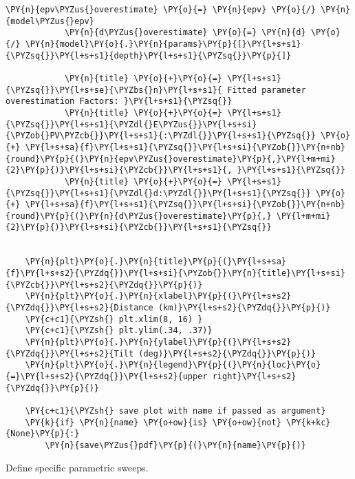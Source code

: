 \begin{tcolorbox}[breakable, size=fbox, boxrule=1pt, pad at break*=1mm,colback=cellbackground, colframe=cellborder]
\begin{Verbatim}[commandchars=\\\{\}]
            \PY{n}{epv\PYZus{}overestimate} \PY{o}{=} \PY{n}{epv} \PY{o}{/} \PY{n}{model\PYZus{}epv}
            \PY{n}{d\PYZus{}overestimate} \PY{o}{=} \PY{n}{d} \PY{o}{/} \PY{n}{model}\PY{o}{.}\PY{n}{params}\PY{p}{[}\PY{l+s+s1}{\PYZsq{}}\PY{l+s+s1}{depth}\PY{l+s+s1}{\PYZsq{}}\PY{p}{]}

            \PY{n}{title} \PY{o}{+}\PY{o}{=} \PY{l+s+s1}{\PYZsq{}}\PY{l+s+se}{\PYZbs{}n}\PY{l+s+s1}{ Fitted parameter overestimation Factors: }\PY{l+s+s1}{\PYZsq{}}
            \PY{n}{title} \PY{o}{+}\PY{o}{=} \PY{l+s+s1}{\PYZsq{}}\PY{l+s+s1}{\PYZdl{}E\PYZus{}}\PY{l+s+si}{\PYZob{}PV\PYZcb{}}\PY{l+s+s1}{:\PYZdl{}}\PY{l+s+s1}{\PYZsq{}} \PY{o}{+} \PY{l+s+sa}{f}\PY{l+s+s1}{\PYZsq{}}\PY{l+s+si}{\PYZob{}}\PY{n+nb}{round}\PY{p}{(}\PY{n}{epv\PYZus{}overestimate}\PY{p}{,}\PY{l+m+mi}{2}\PY{p}{)}\PY{l+s+si}{\PYZcb{}}\PY{l+s+s1}{, }\PY{l+s+s1}{\PYZsq{}}
            \PY{n}{title} \PY{o}{+}\PY{o}{=} \PY{l+s+s1}{\PYZsq{}}\PY{l+s+s1}{\PYZdl{}d:\PYZdl{}}\PY{l+s+s1}{\PYZsq{}} \PY{o}{+} \PY{l+s+sa}{f}\PY{l+s+s1}{\PYZsq{}}\PY{l+s+si}{\PYZob{}}\PY{n+nb}{round}\PY{p}{(}\PY{n}{d\PYZus{}overestimate}\PY{p}{,} \PY{l+m+mi}{2}\PY{p}{)}\PY{l+s+si}{\PYZcb{}}\PY{l+s+s1}{\PYZsq{}}


    \PY{n}{plt}\PY{o}{.}\PY{n}{title}\PY{p}{(}\PY{l+s+sa}{f}\PY{l+s+s2}{\PYZdq{}}\PY{l+s+si}{\PYZob{}}\PY{n}{title}\PY{l+s+si}{\PYZcb{}}\PY{l+s+s2}{\PYZdq{}}\PY{p}{)}
    \PY{n}{plt}\PY{o}{.}\PY{n}{xlabel}\PY{p}{(}\PY{l+s+s2}{\PYZdq{}}\PY{l+s+s2}{Distance (km)}\PY{l+s+s2}{\PYZdq{}}\PY{p}{)}
    \PY{c+c1}{\PYZsh{} plt.xlim(8, 16) }
    \PY{c+c1}{\PYZsh{} plt.ylim(.34, .37)}
    \PY{n}{plt}\PY{o}{.}\PY{n}{ylabel}\PY{p}{(}\PY{l+s+s2}{\PYZdq{}}\PY{l+s+s2}{Tilt (deg)}\PY{l+s+s2}{\PYZdq{}}\PY{p}{)}
    \PY{n}{plt}\PY{o}{.}\PY{n}{legend}\PY{p}{(}\PY{n}{loc}\PY{o}{=}\PY{l+s+s2}{\PYZdq{}}\PY{l+s+s2}{upper right}\PY{l+s+s2}{\PYZdq{}}\PY{p}{)}

    \PY{c+c1}{\PYZsh{} save plot with name if passed as argument}
    \PY{k}{if} \PY{n}{name} \PY{o+ow}{is} \PY{o+ow}{not} \PY{k+kc}{None}\PY{p}{:}
        \PY{n}{save\PYZus{}pdf}\PY{p}{(}\PY{n}{name}\PY{p}{)}
\end{Verbatim}
\end{tcolorbox}

Define specific parametric sweeps.

